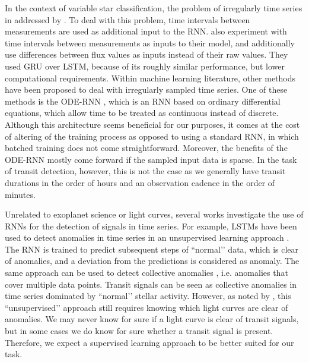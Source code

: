 In the context of variable star classification, the problem of irregularly time series in addressed by \cite{naul2018recurrent}. To deal with this problem, time intervals between measurements are used as additional input to the RNN. \cite{becker2020scalable} also experiment with time intervals between measurements as inputs to their model, and additionally use differences between flux values as inputs instead of their raw values. They used GRU over LSTM, because of its roughly similar performance, but lower computational requirements. Within machine learning literature, other methods have been proposed to deal with irregularly sampled time series. One of these methods is the ODE-RNN \citep{rubanova2019latent, chen2018neural}, which is an RNN based on ordinary differential equations, which allow time to be treated as continuous instead of discrete. Although this architecture seems beneficial for our purposes, it comes at the cost of altering of the training process as opposed to using a standard RNN, in which batched training does not come straightforward. Moreover, the benefits of the ODE-RNN mostly come forward if the sampled input data is sparse. In the task of transit detection, however, this is not the case as we generally have transit durations in the order of hours and an observation cadence in the order of minutes.

Unrelated to exoplanet science or light curves, several works investigate the use of RNNs for the detection of signals in time series. For example, LSTMs have been used to detect anomalies in time series in an unsupervised learning approach \citep{malhotra2015long}. The RNN is trained to predict subsequent steps of ``normal’’ data, which is clear of anomalies, and a deviation from the predictions is considered as anomaly. The same approach can be used to detect collective anomalies \citep{bontemps2016collective}, i.e. anomalies that cover multiple data points. Transit signals can be seen as collective anomalies in time series dominated by ``normal’’ stellar activity. However, as noted by \cite{cherdo2020training}, this ``unsupervised’’ approach still requires knowing which light curves are clear of anomalies. We may never know for sure if a light curve is clear of transit signals, but in some cases we do know for sure whether a transit signal is present. Therefore, we expect a supervised learning approach to be better suited for our task.


